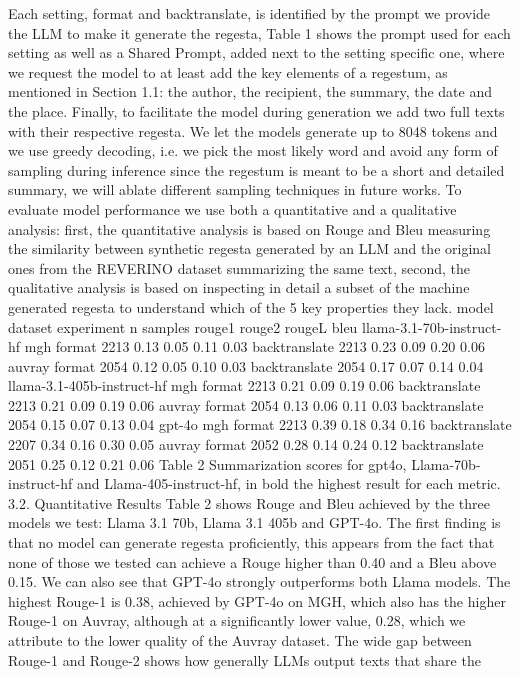 {Each setting, format and backtranslate, is identified by the prompt we provide the LLM to make
it generate the regesta, Table 1 shows the prompt used for each setting as well as a Shared Prompt,
added next to the setting specific one, where we request the model to at least add the key elements of a
regestum, as mentioned in Section 1.1: the author, the recipient, the summary, the date and the place.
Finally, to facilitate the model during generation we add two full texts with their respective regesta.
We let the models generate up to 8048 tokens and we use greedy decoding, i.e. we pick the most
likely word and avoid any form of sampling during inference since the regestum is meant to be a short
and detailed summary, we will ablate different sampling techniques in future works.
To evaluate model performance we use both a quantitative and a qualitative analysis: first, the
quantitative analysis is based on Rouge and Bleu measuring the similarity between synthetic regesta
generated by an LLM and the original ones from the REVERINO dataset summarizing the same text,
second, the qualitative analysis is based on inspecting in detail a subset of the machine generated regesta
to understand which of the 5 key properties they lack.
model dataset experiment n samples rouge1 rouge2 rougeL bleu
llama-3.1-70b-instruct-hf
mgh format 2213 0.13 0.05 0.11 0.03
backtranslate 2213 0.23 0.09 0.20 0.06
auvray
format 2054 0.12 0.05 0.10 0.03
backtranslate 2054 0.17 0.07 0.14 0.04
llama-3.1-405b-instruct-hf
mgh format 2213 0.21 0.09 0.19 0.06
backtranslate 2213 0.21 0.09 0.19 0.06
auvray
format 2054 0.13 0.06 0.11 0.03
backtranslate 2054 0.15 0.07 0.13 0.04
gpt-4o
mgh format 2213 0.39 0.18 0.34 0.16
backtranslate 2207 0.34 0.16 0.30 0.05
auvray
format 2052 0.28 0.14 0.24 0.12
backtranslate 2051 0.25 0.12 0.21 0.06
Table 2
Summarization scores for gpt4o, Llama-70b-instruct-hf and Llama-405-instruct-hf, in bold the highest result for
each metric.
3.2. Quantitative Results
Table 2 shows Rouge and Bleu achieved by the three models we test: Llama 3.1 70b, Llama 3.1 405b and
GPT-4o. The first finding is that no model can generate regesta proficiently, this appears from the fact
that none of those we tested can achieve a Rouge higher than 0.40 and a Bleu above 0.15. We can also
see that GPT-4o strongly outperforms both Llama models. The highest Rouge-1 is 0.38, achieved by
GPT-4o on MGH, which also has the higher Rouge-1 on Auvray, although at a significantly lower value,
0.28, which we attribute to the lower quality of the Auvray dataset.
The wide gap between Rouge-1 and Rouge-2 shows how generally LLMs output texts that share the
}
